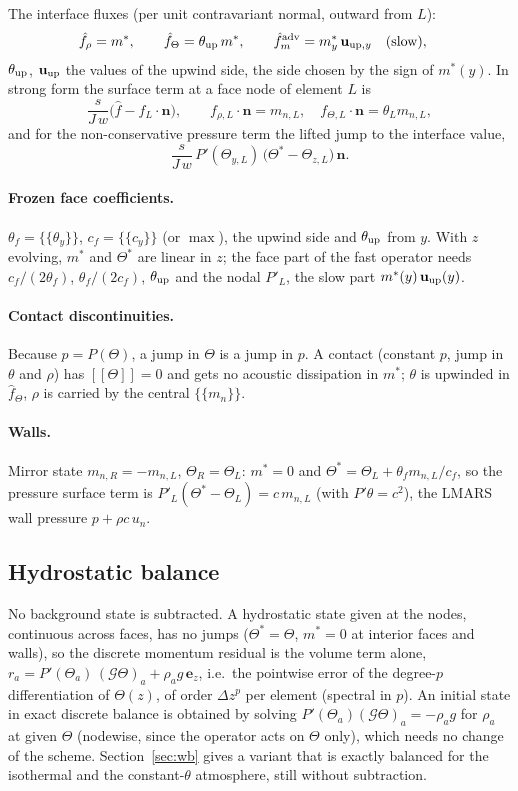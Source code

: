 \documentclass[11pt,a4paper]{article}
\newcommand{\avg}[1]{\{\!\{#1\}\!\}}
\newcommand{\jump}[1]{[\![#1]\!]}
\begin{document}
The interface fluxes (per unit contravariant normal, outward from $L$):
\begin{align*}
\hat f_\rho&=m^*,\qquad \hat f_\Theta=\theta_{\rm up}\,m^*,\qquad
\hat f_m^{\rm adv}=m^*_y\,\mathbf u_{{\rm up},y}\quad(\text{slow}),
\end{align*}
$\theta_{\rm up}$, $\mathbf u_{\rm up}$ the values of the upwind side, the side chosen by the sign of $m^*(y)$.
In strong form the surface term at a face node of element $L$ is
\[
\frac{s}{J\,w}\Big(\hat f-f_L\cdot\mathbf n\Big),\qquad f_{\rho,L}\cdot\mathbf n=m_{n,L},\quad f_{\Theta,L}\cdot\mathbf n=\theta_L m_{n,L},
\]
and for the non-conservative pressure term the lifted jump to the interface value,
\[
\frac{s}{J\,w}\,P'(\Theta_{y,L})\,\big(\Theta^*-\Theta_{z,L}\big)\,\mathbf n .
\]
\paragraph{Frozen face coefficients.} $\theta_f=\avg{\theta_y}$, $c_f=\avg{c_y}$ (or $\max$), the upwind side and
$\theta_{\rm up}$ from $y$. With $z$ evolving, $m^*$ and $\Theta^*$ are linear in $z$; the face part of the fast
operator needs $c_f/(2\theta_f)$, $\theta_f/(2c_f)$, $\theta_{\rm up}$ and the nodal $P'_L$, the slow part
$m^*(y)\,\mathbf u_{\rm up}(y)$.
\paragraph{Contact discontinuities.} Because $p=P(\Theta)$, a jump in $\Theta$ is a jump in $p$. A contact
(constant $p$, jump in $\theta$ and $\rho$) has $\jump\Theta=0$ and gets no acoustic dissipation in $m^*$;
$\theta$ is upwinded in $\hat f_\Theta$, $\rho$ is carried by the central $\avg{m_n}$.
\paragraph{Walls.} Mirror state $m_{n,R}=-m_{n,L}$, $\Theta_R=\Theta_L$: $m^*=0$ and
$\Theta^*=\Theta_L+\theta_f m_{n,L}/c_f$, so the pressure surface term is
$P'_L(\Theta^*-\Theta_L)=c\,m_{n,L}$ (with $P'\theta=c^2$), the LMARS wall pressure $p+\rho c\,u_n$.

\subsection{Hydrostatic balance}\label{sec:balance}
No background state is subtracted. A hydrostatic state given at the nodes, continuous across faces,
has no jumps ($\Theta^*=\Theta$, $m^*=0$ at interior faces and walls), so the discrete momentum residual
is the volume term alone, $r_a=P'(\Theta_a)\,(\mathcal G\Theta)_a+\rho_a g\,\mathbf e_z$, i.e.\ the
pointwise error of the degree-$p$ differentiation of $\Theta(z)$, of order $\Delta z^{p}$ per element
(spectral in $p$). An initial state in exact discrete balance is obtained by solving
$P'(\Theta_a)(\mathcal G\Theta)_a=-\rho_a g$ for $\rho_a$ at given $\Theta$ (nodewise, since the operator
acts on $\Theta$ only), which needs no change of the scheme. Section~\ref{sec:wb} gives a variant that
is exactly balanced for the isothermal and the constant-$\theta$ atmosphere, still without subtraction.
\end{document}
